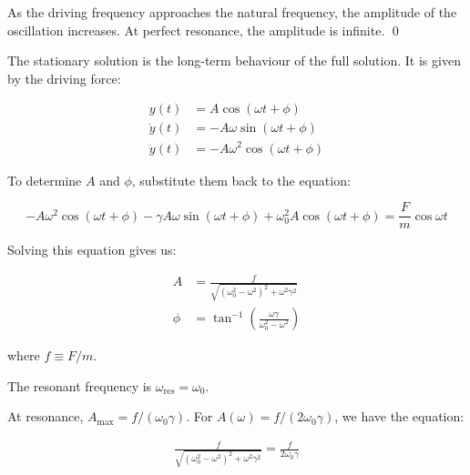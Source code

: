 \documentclass[12pt]{article}
\begin{document}
As the driving frequency approaches the natural frequency, the amplitude of the oscillation increases. At perfect resonance, the amplitude is infinite.
\qed



The stationary solution is the long-term behaviour of the full solution. It is given by the driving force:

\begin{equation}
    \begin{split}
        y(t) &= A \cos{(\omega t + \phi)} \\
        \dot{y}(t) &= -A \omega \sin{(\omega t + \phi)} \\
        \ddot{y}(t) &= -A \omega^{2} \cos{(\omega t + \phi)}
    \end{split}
\end{equation}

To determine $A$ and $\phi$, substitute them back to the equation:

\begin{equation}
    -A \omega^{2} \cos{(\omega t + \phi)} - \gamma A \omega \sin{(\omega t + \phi)} + \omega_{0}^{2} A \cos{(\omega t + \phi)} = \frac{F}{m} \cos{\omega t}
\end{equation}

Solving this equation gives us:

\begin{equation}
    \begin{split}
        A &= \frac{f}{\sqrt{(\omega_{0}^{2} - \omega^{2})^{2} + \omega^{2} \gamma^{2}}} \\
        \phi &= \tan^{-1}{\left( \frac{\omega \gamma}{\omega_{0}^{2} - \omega^{2}} \right)}
    \end{split}
\end{equation}

where $f \equiv F/m$.

The resonant frequency is $\omega_{\text{res}} = \omega_{0}$.

At resonance, $A_{\text{max}} = f/(\omega_{0} \gamma)$. For $A(\omega) = f/(2\omega_{0} \gamma)$, we have the equation:

\begin{equation}
    \begin{split}
        \frac{f}{\sqrt{(\omega_{0}^{2} - \omega^{2})^{2} + \omega^{2} \gamma^{2}}} = \frac{f}{2\omega_{0} \gamma} \\
    \end{split}
\end{equation}
\end{document}
